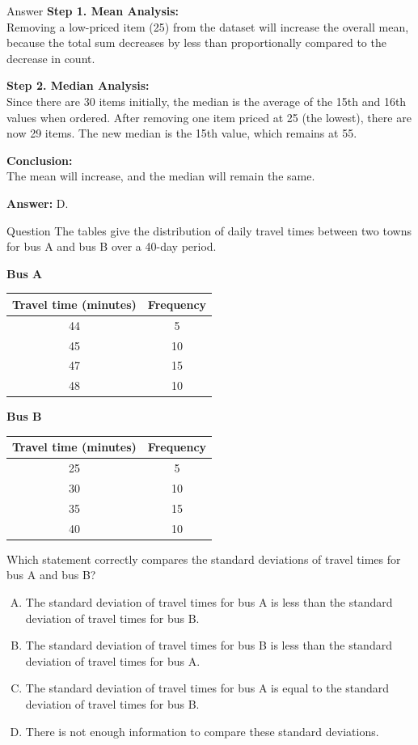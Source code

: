 \documentclass{beamer}
\begin{document}
\begin{frame}{Answer}
\textbf{Step 1. Mean Analysis:} \\
Removing a low-priced item (25) from the dataset will increase the overall mean, because the total sum decreases by less than proportionally compared to the decrease in count.

\textbf{Step 2. Median Analysis:} \\
Since there are 30 items initially, the median is the average of the 15th and 16th values when ordered. After removing one item priced at 25 (the lowest), there are now 29 items. The new median is the 15th value, which remains at 55.

\textbf{Conclusion:} \\
The mean will increase, and the median will remain the same.

\textbf{Answer:} D.
\end{frame}


\begin{frame}{Question}
\scriptsize
The tables give the distribution of daily travel times between two towns for bus A and bus B over a 40-day period.

\begin{center}
\textbf{Bus A}
\begin{tabular}{|c|c|}
\hline
Travel time (minutes) & Frequency \\
\hline
44 & 5 \\
45 & 10 \\
47 & 15 \\
48 & 10 \\
\hline
\end{tabular}
\end{center}

\begin{center}
\textbf{Bus B}
\begin{tabular}{|c|c|}
\hline
Travel time (minutes) & Frequency \\
\hline
25 & 5 \\
30 & 10 \\
35 & 15 \\
40 & 10 \\
\hline
\end{tabular}
\end{center}

Which statement correctly compares the standard deviations of travel times for bus A and bus B?

\begin{enumerate}[A.]
    \item The standard deviation of travel times for bus A is less than the standard deviation of travel times for bus B.
    \item The standard deviation of travel times for bus B is less than the standard deviation of travel times for bus A.
    \item The standard deviation of travel times for bus A is equal to the standard deviation of travel times for bus B.
    \item There is not enough information to compare these standard deviations.
\end{enumerate}
\end{frame}
\end{document}
